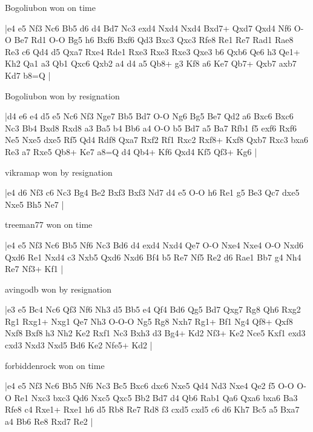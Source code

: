 \showboard

Bogoliubon won on time

\makegametitle
|e4 e5 Nf3 Nc6 Bb5 d6 d4 Bd7 Nc3 exd4 Nxd4 Nxd4 Bxd7+ Qxd7 Qxd4 Nf6 O-O Be7 Rd1 O-O Bg5 h6 Bxf6 Bxf6 Qd3 Bxc3 Qxc3 Rfe8 Re1 Re7 Rad1 Rae8 Re3 c6 Qd4 d5 Qxa7 Rxe4 Rde1 Rxe3 Rxe3 Rxe3 Qxe3 b6 Qxb6 Qe6 h3 Qe1+ Kh2 Qa1 a3 Qb1 Qxc6 Qxb2 a4 d4 a5 Qb8+ g3 Kf8 a6 Ke7 Qb7+ Qxb7 axb7 Kd7 b8=Q  |

\showboard

Bogoliubon won by resignation

\makegametitle
|d4 e6 e4 d5 e5 Nc6 Nf3 Nge7 Bb5 Bd7 O-O Ng6 Bg5 Be7 Qd2 a6 Bxc6 Bxc6 Nc3 Bb4 Bxd8 Rxd8 a3 Ba5 b4 Bb6 a4 O-O b5 Bd7 a5 Ba7 Rfb1 f5 exf6 Rxf6 Ne5 Nxe5 dxe5 Rf5 Qd4 Rdf8 Qxa7 Rxf2 Rf1 Rxc2 Rxf8+ Kxf8 Qxb7 Rxc3 bxa6 Re3 a7 Rxe5 Qb8+ Ke7 a8=Q d4 Qb4+ Kf6 Qxd4 Kf5 Qf3+ Kg6  |

\showboard

vikramap won by resignation

\makegametitle
|e4 d6 Nf3 c6 Nc3 Bg4 Be2 Bxf3 Bxf3 Nd7 d4 e5 O-O h6 Re1 g5 Be3 Qc7 dxe5 Nxe5 Bh5 Ne7  |

\showboard

treeman77 won on time

\makegametitle
|e4 e5 Nf3 Nc6 Bb5 Nf6 Nc3 Bd6 d4 exd4 Nxd4 Qe7 O-O Nxe4 Nxe4 O-O Nxd6 Qxd6 Re1 Nxd4 c3 Nxb5 Qxd6 Nxd6 Bf4 b5 Re7 Nf5 Re2 d6 Rae1 Bb7 g4 Nh4 Re7 Nf3+ Kf1  |

\showboard

avingodb won by resignation

\makegametitle
|e3 e5 Bc4 Nc6 Qf3 Nf6 Nh3 d5 Bb5 e4 Qf4 Bd6 Qg5 Bd7 Qxg7 Rg8 Qh6 Rxg2 Rg1 Rxg1+ Nxg1 Qe7 Nh3 O-O-O Ng5 Rg8 Nxh7 Rg1+ Bf1 Ng4 Qf8+ Qxf8 Nxf8 Bxf8 h3 Nh2 Ke2 Rxf1 Nc3 Bxh3 d3 Bg4+ Kd2 Nf3+ Ke2 Nce5 Kxf1 exd3 cxd3 Nxd3 Nxd5 Bd6 Ke2 Nfe5+ Kd2  |

\showboard

forbiddenrock won on time

\makegametitle
|e4 e5 Nf3 Nc6 Bb5 Nf6 Nc3 Bc5 Bxc6 dxc6 Nxe5 Qd4 Nd3 Nxe4 Qe2 f5 O-O O-O Re1 Nxc3 bxc3 Qd6 Nxc5 Qxc5 Bb2 Bd7 d4 Qb6 Rab1 Qa6 Qxa6 bxa6 Ba3 Rfe8 c4 Rxe1+ Rxe1 h6 d5 Rb8 Re7 Rd8 f3 cxd5 cxd5 c6 d6 Kh7 Bc5 a5 Bxa7 a4 Bb6 Re8 Rxd7 Re2  |

